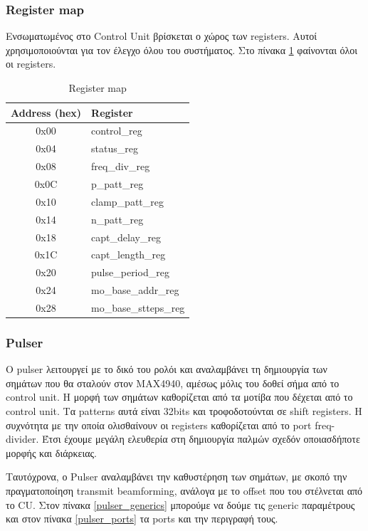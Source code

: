 \documentclass[12pt,a4paper]{book}
\begin{document}
\subsubsection{Register map}
Ενσωματωμένος στο Control Unit βρίσκεται ο χώρος των registers. Αυτοί χρησιμοποιούνται για τον έλεγχο όλου του συστήματος. Στο πίνακα \ref{Registers} φαίνονται όλοι οι registers.
\begin{table}
\center
\begin{tabular}{|c|l|}
\hline 
Address (hex) & Register \\
\hline 
\hline 
0x00 & control\_reg \\
\hline 
0x04 & status\_reg \\
\hline 
0x08 & freq\_div\_reg \\
\hline 
0x0C & p\_patt\_reg \\
\hline 
0x10 & clamp\_patt\_reg \\
\hline 
0x14 & n\_patt\_reg \\
\hline 
0x18 & capt\_delay\_reg \\
\hline 
0x1C & capt\_length\_reg \\
\hline 
0x20 & pulse\_period\_reg \\
\hline 
0x24 & mo\_base\_addr\_reg \\
\hline 
0x28 & mo\_base\_stteps\_reg \\
\hline
\end{tabular} 
\caption{Register map}
\label{Registers} 
\end{table} 

\subsubsection{Pulser}
O pulser λειτουργεί με το δικό του ρολόι και αναλαμβάνει τη δημιουργία των σημάτων που θα σταλούν στον MAX4940, αμέσως μόλις του δοθεί σήμα από το control unit. Η μορφή των σημάτων καθορίζεται από τα μοτίβα που δέχεται από το control unit. Τα patterns αυτά είναι 32bits και τροφοδοτούνται σε shift registers. Η συχνότητα με την οποία ολισθαίνουν οι registers καθορίζεται από το port freq-divider. Έτσι έχουμε μεγάλη ελευθερία στη δημιουργία παλμών σχεδόν οποιασδήποτε μορφής και διάρκειας.


Ταυτόχρονα, ο Pulser  αναλαμβάνει την καθυστέρηση των σημάτων, με σκοπό την πραγματοποίηση transmit beamforming, ανάλογα με το offset που του στέλνεται από το CU. Στον πίνακα \ref{pulser_generics} μπορούμε να δούμε τις generic παραμέτρους και στον πίνακα \ref{pulser_ports} τα ports  και την περιγραφή τους.
\end{document}
